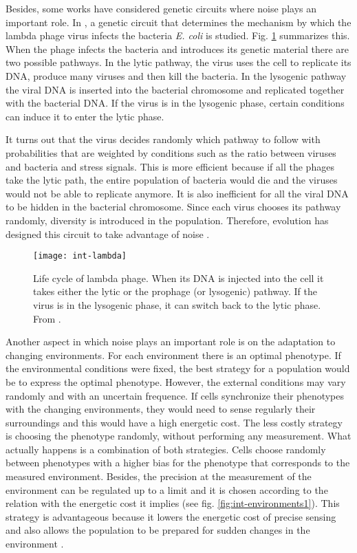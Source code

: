 Besides, some works have considered genetic circuits where noise plays an important role. In \cite{arkin98}, a genetic circuit that determines the mechanism by which the lambda phage virus infects the bacteria \textit{E. coli} is studied. Fig. \ref{fig:int-lambda} summarizes this. When the phage infects the bacteria and introduces its genetic material there are two possible pathways. In the lytic pathway, the virus uses the cell to replicate its DNA, produce many viruses and then kill the bacteria. In the lysogenic pathway the viral DNA is inserted into the bacterial chromosome and replicated together with the bacterial DNA. If the virus is in the lysogenic phase, certain conditions can induce it to enter the lytic phase.

It turns out that the virus decides randomly which pathway to follow with probabilities that are weighted by conditions such as the ratio between viruses and bacteria and stress signals. This is more efficient because if all the phages take the lytic path, the entire population of bacteria would die and the viruses would not be able to replicate anymore. It is also inefficient for all the viral DNA to be hidden in the bacterial chromosome. Since each virus chooses its pathway randomly, diversity is introduced in the population. Therefore, evolution has designed this circuit to take advantage of noise \cite{arkin98}.

\begin{figure}[H]
  \centering
  \texttt{[image: int-lambda]}
  \caption[Life cycle of lambda phage]{\label{fig:int-lambda} Life cycle of lambda phage. When its DNA is injected into the cell it takes either the lytic or the prophage (or lysogenic) pathway. If the virus is in the lysogenic phase, it can switch back to the lytic phase. From \cite{alberts08}.}
\end{figure}

Another aspect in which noise plays an important role is on the adaptation to changing environments. For each environment there is an optimal phenotype. If the environmental conditions were fixed, the best strategy for a population would be to express the optimal phenotype. However, the external conditions may vary randomly and with an uncertain frequence. If cells synchronize their phenotypes with the changing environments, they would need to sense regularly their surroundings and this would have a high energetic cost. The less costly strategy is choosing the phenotype randomly, without performing any measurement. What actually happens is a combination of both strategies. Cells choose randomly between phenotypes with a higher bias for the phenotype that corresponds to the measured environment. Besides, the precision at the measurement of the environment can be regulated up to a limit and it is chosen according to the relation with the energetic cost it implies (see fig. \ref{fig:int-environments1}). This strategy is advantageous because it lowers the energetic cost of precise sensing and also allows the population to be prepared for sudden changes in the environment \cite{kussell05}.

